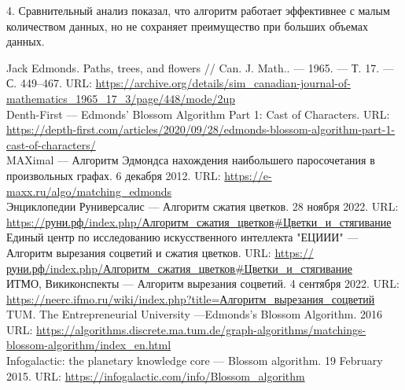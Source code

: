 \documentclass[14pt, a4paper]{extarticle}
\begin{document}
    4. Сравнительный анализ показал, что алгоритм работает эффективнее с малым количеством данных, но не сохраняет преимущество при больших объемах данных.\\

    \pagebreak
    
    \begin{thebibliography}{}

    Jack Edmonds. Paths, trees, and flowers // Can. J. Math.. — 1965. — Т. 17. — С. 449–467.
    URL: \href{https://archive.org/details/sim_canadian-journal-of-mathematics_1965_17_3/page/448/mode/2up}{https://archive.org/details/sim\_canadian-journal-of-mathematics\_1965\_17\_3/page/448/mode/2up}\\
    
    Denth-First --- Edmonds' Blossom Algorithm Part 1: Cast of Characters. URL: \href{https://depth-first.com/articles/2020/09/28/edmonds-blossom-algorithm-part-1-cast-of-characters/}
    {https://depth-first.com/articles/2020/09/28/edmonds-blossom-algorithm-part-1-cast-of-characters/}\\

    MAXimal --- Алгоритм Эдмондса нахождения наибольшего паросочетания в произвольных графах. 6 декабря 2012. 
    URL: \href{https://e-maxx.ru/algo/matching_edmonds}
    {https://e-maxx.ru/algo/matching\_edmonds}\\
    
    Энциклопедии Руниверсалис --- Алгоритм сжатия цветков.  28 ноября 2022. URL: \href{https://руни.рф/index.php/Алгоритм_сжатия_цветков#Цветки_и_стягивание}
    {https://руни.рф/index.php/Алгоритм\_сжатия\_цветков\#Цветки\_и\_стягивание}\\
    
    Единый центр по исследованию искусственного интеллекта "ЕЦИИИ" --- Алгоритм вырезания соцветий и сжатия цветков. URL: \href{https://intellect.icu/algoritm-vyrezaniya-sotsvetij-i-szhatiya-tsvetkov-8626}
    {https://руни.рф/index.php/Алгоритм\_сжатия\_цветков\#Цветки\_и\_стягивание}\\

    ИТМО, Викиконспекты --- Алгоритм вырезания соцветий.  4 сентября 2022. 
    URL: \href{https://neerc.ifmo.ru/wiki/index.php?title=Алгоритм_вырезания_соцветий}{https://neerc.ifmo.ru/wiki/index.php?title=Алгоритм\_вырезания\_соцветий}\\

    TUM. The Entrepreneurial University ---Edmonds's Blossom Algorithm. 2016 URL: \href{https://algorithms.discrete.ma.tum.de/graph-algorithms/matchings-blossom-algorithm/index_en.html}
    {https://algorithms.discrete.ma.tum.de/graph-algorithms/matchings-blossom-algorithm/index_en.html}\\

    Infogalactic: the planetary knowledge core --- Blossom algorithm. 19 February 2015. URL: \href{https://infogalactic.com/info/Blossom_algorithm}
    {https://infogalactic.com/info/Blossom_algorithm}\\

    \end{thebibliography}    
    
    \printbibliography
    
\end{document}
